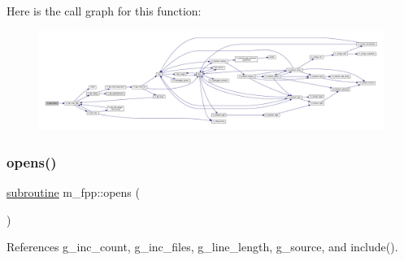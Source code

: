 Here is the call graph for this function\+:
\nopagebreak
\begin{figure}[H]
\begin{center}
\leavevmode
\includegraphics[width=350pt]{namespacem__fpp_ac32c830615f875efaf8678759daa7f39_cgraph}
\end{center}
\end{figure}
\mbox{\label{namespacem__fpp_a74802eb09b223cb8856d01e9247ff46e}} 
\subsubsection{\texorpdfstring{opens()}{opens()}}
{\footnotesize\ttfamily \hyperlink{M__stopwatch_83_8txt_acfbcff50169d691ff02d4a123ed70482}{subroutine} m\+\_\+fpp\+::opens (\begin{DoxyParamCaption}{ }\end{DoxyParamCaption})}



References g\+\_\+inc\+\_\+count, g\+\_\+inc\+\_\+files, g\+\_\+line\+\_\+length, g\+\_\+source, and include().

